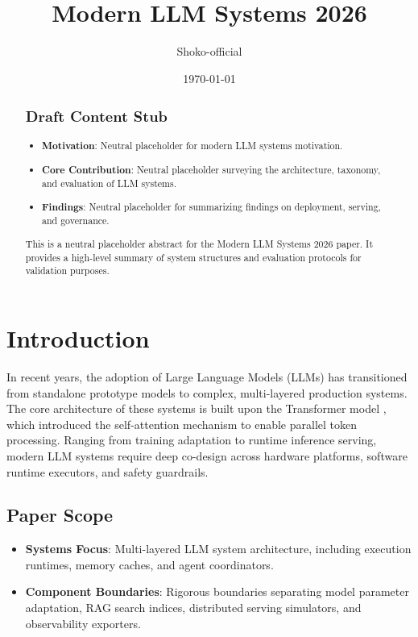 \documentclass[11pt]{article}
\title{Modern LLM Systems 2026}
\author{Shoko-official}
\date{\today}
\begin{document}
\maketitle

\begin{abstract}
\subsection{Draft Content Stub}

\begin{itemize}
  \item \textbf{Motivation}: Neutral placeholder for modern LLM systems motivation.
  \item \textbf{Core Contribution}: Neutral placeholder surveying the architecture, taxonomy, and evaluation of LLM systems.
  \item \textbf{Findings}: Neutral placeholder for summarizing findings on deployment, serving, and governance.
\end{itemize}

This is a neutral placeholder abstract for the Modern LLM Systems 2026 paper. It provides a high-level summary of system structures and evaluation protocols for validation purposes.
\end{abstract}

\section{Introduction}

In recent years, the adoption of Large Language Models (LLMs) has transitioned from standalone prototype models to complex, multi-layered production systems. The core architecture of these systems is built upon the Transformer model \cite{source-attention-2017}, which introduced the self-attention mechanism to enable parallel token processing. Ranging from training adaptation to runtime inference serving, modern LLM systems require deep co-design across hardware platforms, software runtime executors, and safety guardrails.

\subsection{Paper Scope}

\begin{itemize}
  \item \textbf{Systems Focus}: Multi-layered LLM system architecture, including execution runtimes, memory caches, and agent coordinators.
  \item \textbf{Component Boundaries}: Rigorous boundaries separating model parameter adaptation, RAG search indices, distributed serving simulators, and observability exporters.
\end{itemize}
\end{document}
